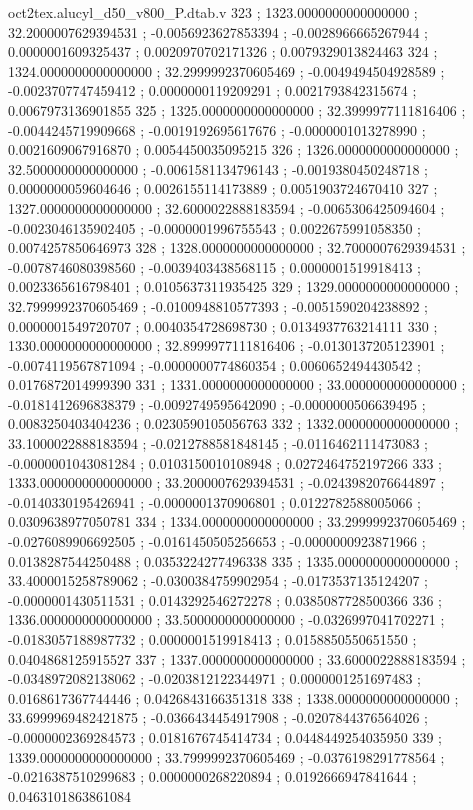 \begin{filecontents}[overwrite]{oct2tex.alucyl_d50_v800_P.dtab.v}
323 ; 1323.0000000000000000 ; 32.2000007629394531 ; -0.0056923627853394 ; -0.0028966665267944 ; 0.0000001609325437 ; 0.0020970702171326 ; 0.0079329013824463
324 ; 1324.0000000000000000 ; 32.2999992370605469 ; -0.0049494504928589 ; -0.0023707747459412 ; 0.0000000119209291 ; 0.0021793842315674 ; 0.0067973136901855
325 ; 1325.0000000000000000 ; 32.3999977111816406 ; -0.0044245719909668 ; -0.0019192695617676 ; -0.0000001013278990 ; 0.0021609067916870 ; 0.0054450035095215
326 ; 1326.0000000000000000 ; 32.5000000000000000 ; -0.0061581134796143 ; -0.0019380450248718 ; 0.0000000059604646 ; 0.0026155114173889 ; 0.0051903724670410
327 ; 1327.0000000000000000 ; 32.6000022888183594 ; -0.0065306425094604 ; -0.0023046135902405 ; -0.0000001996755543 ; 0.0022675991058350 ; 0.0074257850646973
328 ; 1328.0000000000000000 ; 32.7000007629394531 ; -0.0078746080398560 ; -0.0039403438568115 ; 0.0000001519918413 ; 0.0023365616798401 ; 0.0105637311935425
329 ; 1329.0000000000000000 ; 32.7999992370605469 ; -0.0100948810577393 ; -0.0051590204238892 ; 0.0000001549720707 ; 0.0040354728698730 ; 0.0134937763214111
330 ; 1330.0000000000000000 ; 32.8999977111816406 ; -0.0130137205123901 ; -0.0074119567871094 ; -0.0000000774860354 ; 0.0060652494430542 ; 0.0176872014999390
331 ; 1331.0000000000000000 ; 33.0000000000000000 ; -0.0181412696838379 ; -0.0092749595642090 ; -0.0000000506639495 ; 0.0083250403404236 ; 0.0230590105056763
332 ; 1332.0000000000000000 ; 33.1000022888183594 ; -0.0212788581848145 ; -0.0116462111473083 ; -0.0000001043081284 ; 0.0103150010108948 ; 0.0272464752197266
333 ; 1333.0000000000000000 ; 33.2000007629394531 ; -0.0243982076644897 ; -0.0140330195426941 ; -0.0000001370906801 ; 0.0122782588005066 ; 0.0309638977050781
334 ; 1334.0000000000000000 ; 33.2999992370605469 ; -0.0276089906692505 ; -0.0161450505256653 ; -0.0000000923871966 ; 0.0138287544250488 ; 0.0353224277496338
335 ; 1335.0000000000000000 ; 33.4000015258789062 ; -0.0300384759902954 ; -0.0173537135124207 ; -0.0000001430511531 ; 0.0143292546272278 ; 0.0385087728500366
336 ; 1336.0000000000000000 ; 33.5000000000000000 ; -0.0326997041702271 ; -0.0183057188987732 ; 0.0000001519918413 ; 0.0158850550651550 ; 0.0404868125915527
337 ; 1337.0000000000000000 ; 33.6000022888183594 ; -0.0348972082138062 ; -0.0203812122344971 ; 0.0000001251697483 ; 0.0168617367744446 ; 0.0426843166351318
338 ; 1338.0000000000000000 ; 33.6999969482421875 ; -0.0366434454917908 ; -0.0207844376564026 ; -0.0000002369284573 ; 0.0181676745414734 ; 0.0448449254035950
339 ; 1339.0000000000000000 ; 33.7999992370605469 ; -0.0376198291778564 ; -0.0216387510299683 ; 0.0000000268220894 ; 0.0192666947841644 ; 0.0463101863861084

\end{filecontents}
